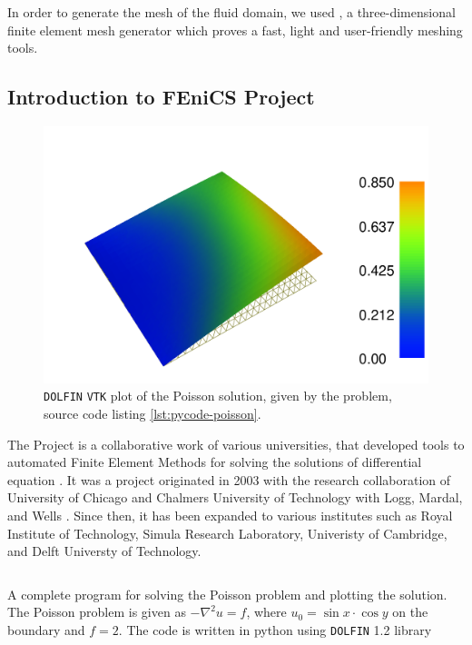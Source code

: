 In order to generate the mesh of the fluid domain, we used \gmsh, a three-dimensional finite element mesh generator which proves a fast, light and user-friendly meshing tools.

\subsection{Introduction to FEniCS Project}

	\begin{figure}[t]
	\centering
	\includegraphics[width=0.5\linewidth]{./figures/eulerian/dolfinExampleFigure-rotated270.pdf}
	\caption{\texttt{DOLFIN} \texttt{VTK} plot of the Poisson solution, given by the problem, source code listing \ref{lst:pycode-poisson}.}
	\label{fig:dolfinExampleFigure}
	\end{figure}

The \fenics Project is a collaborative work of various universities, that developed tools to automated Finite Element Methods for solving the solutions of differential equation \cite{FenicsAbout}. It was a project originated in 2003 with the research collaboration of University of Chicago and Chalmers University of Technology with Logg,  Mardal, and Wells \cite{Logg2012a}. Since then, it has been expanded to various institutes such as Royal Institute of Technology, Simula Research Laboratory, Univeristy of Cambridge, and Delft Universty of Technology.

	\begin{listing}[p]
	\inputminted[fontseries=courier,obeytabs,fontsize=\footnotesize,mathescape,linenos,numbersep=5pt,frame=lines,framesep=2mm,xleftmargin=20mm,xrightmargin=20mm]{python}{figures/eulerian/dolfinExample.py}
	\caption{A complete program for solving the Poisson problem and plotting the solution. The Poisson problem is given as $-\nabla^2{u} = f$, where $u_0 = \sin{x}\cdot\cos{y}$ on the boundary and $f=2$. The code is written in python using \texttt{DOLFIN} 1.2 library}
	\label{lst:pycode-poisson}
	\end{listing}

